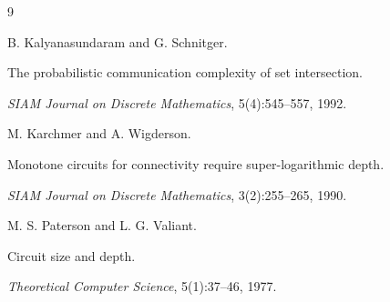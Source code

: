 






\begin{thebibliography}{9}












B. Kalyanasundaram and G. Schnitger.






The probabilistic communication complexity of set intersection.






\textit{SIAM Journal on Discrete Mathematics}, 5(4):545–557, 1992.



















M. Karchmer and A. Wigderson.






Monotone circuits for connectivity require super-logarithmic depth.






\textit{SIAM Journal on Discrete Mathematics}, 3(2):255–265, 1990.



















M. S. Paterson and L. G. Valiant.






Circuit size and depth.






\textit{Theoretical Computer Science}, 5(1):37–46, 1977.














\end{thebibliography}
